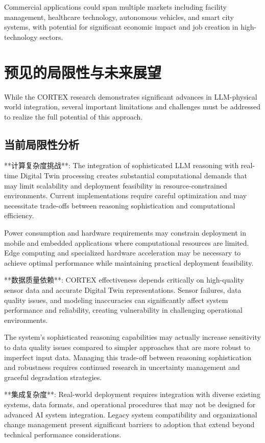 Commercial applications could span multiple markets including facility management, healthcare technology, autonomous vehicles, and smart city systems, with potential for significant economic impact and job creation in high-technology sectors.

\section{预见的局限性与未来展望}

While the CORTEX research demonstrates significant advances in LLM-physical world integration, several important limitations and challenges must be addressed to realize the full potential of this approach.

\subsection{当前局限性分析}

**计算复杂度挑战**:
The integration of sophisticated LLM reasoning with real-time Digital Twin processing creates substantial computational demands that may limit scalability and deployment feasibility in resource-constrained environments. Current implementations require careful optimization and may necessitate trade-offs between reasoning sophistication and computational efficiency.

Power consumption and hardware requirements may constrain deployment in mobile and embedded applications where computational resources are limited. Edge computing and specialized hardware acceleration may be necessary to achieve optimal performance while maintaining practical deployment feasibility.

**数据质量依赖**:
CORTEX effectiveness depends critically on high-quality sensor data and accurate Digital Twin representations. Sensor failures, data quality issues, and modeling inaccuracies can significantly affect system performance and reliability, creating vulnerability in challenging operational environments.

The system's sophisticated reasoning capabilities may actually increase sensitivity to data quality issues compared to simpler approaches that are more robust to imperfect input data. Managing this trade-off between reasoning sophistication and robustness requires continued research in uncertainty management and graceful degradation strategies.

**集成复杂度**:
Real-world deployment requires integration with diverse existing systems, data formats, and operational procedures that may not be designed for advanced AI system integration. Legacy system compatibility and organizational change management present significant barriers to adoption that extend beyond technical performance considerations.

